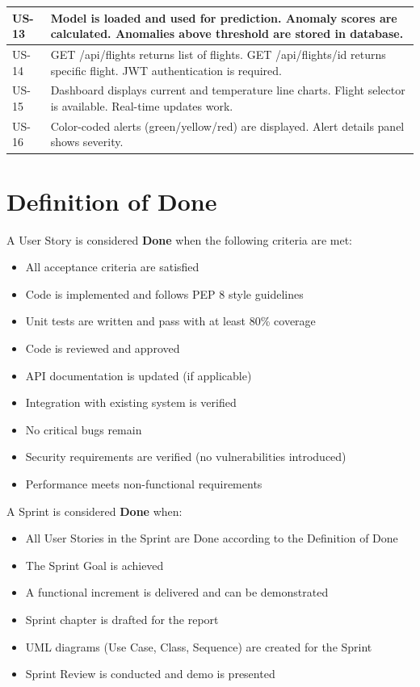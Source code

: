 \begin{table}[H]
\begin{tabular}{|p{1.5cm}|p{10cm}|}
\hline
US-13 & Model is loaded and used for prediction. Anomaly scores are calculated. Anomalies above threshold are stored in database. \\
\hline
US-14 & GET /api/flights returns list of flights. GET /api/flights/{id} returns specific flight. JWT authentication is required. \\
\hline
US-15 & Dashboard displays current and temperature line charts. Flight selector is available. Real-time updates work. \\
\hline
US-16 & Color-coded alerts (green/yellow/red) are displayed. Alert details panel shows severity. \\
\hline
\end{tabular}
\end{table}

\section{Definition of Done}

A User Story is considered \textbf{Done} when the following criteria are met:

\begin{itemize}
    \item All acceptance criteria are satisfied
    \item Code is implemented and follows PEP 8 style guidelines
    \item Unit tests are written and pass with at least 80\% coverage
    \item Code is reviewed and approved
    \item API documentation is updated (if applicable)
    \item Integration with existing system is verified
    \item No critical bugs remain
    \item Security requirements are verified (no vulnerabilities introduced)
    \item Performance meets non-functional requirements
\end{itemize}

A Sprint is considered \textbf{Done} when:

\begin{itemize}
    \item All User Stories in the Sprint are Done according to the Definition of Done
    \item The Sprint Goal is achieved
    \item A functional increment is delivered and can be demonstrated
    \item Sprint chapter is drafted for the report
    \item UML diagrams (Use Case, Class, Sequence) are created for the Sprint
    \item Sprint Review is conducted and demo is presented
\end{itemize}

